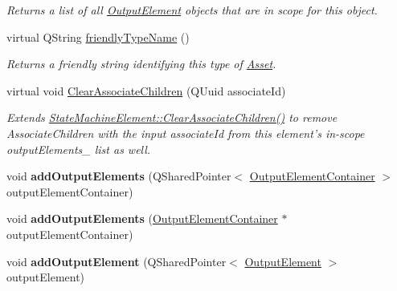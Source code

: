 \begin{DoxyCompactItemize}
\begin{DoxyCompactList}\small\item\em Returns a list of all \hyperlink{class_picto_1_1_output_element}{Output\-Element} objects that are in scope for this object. \end{DoxyCompactList}\item 
virtual Q\-String \hyperlink{class_picto_1_1_output_element_container_aeb790e110381366623cda30e484eba89}{friendly\-Type\-Name} ()
\begin{DoxyCompactList}\small\item\em Returns a friendly string identifying this type of \hyperlink{class_picto_1_1_asset}{Asset}. \end{DoxyCompactList}\item 
\hypertarget{class_picto_1_1_output_element_container_a557009c1557ac06b07cd77bf8efc57c8}{virtual void \hyperlink{class_picto_1_1_output_element_container_a557009c1557ac06b07cd77bf8efc57c8}{Clear\-Associate\-Children} (Q\-Uuid associate\-Id)}\label{class_picto_1_1_output_element_container_a557009c1557ac06b07cd77bf8efc57c8}

\begin{DoxyCompactList}\small\item\em Extends \hyperlink{class_picto_1_1_scriptable_container_aae5dda0b9e1a2e2d8f9e182d28099020}{State\-Machine\-Element\-::\-Clear\-Associate\-Children()} to remove Associate\-Children with the input associate\-Id from this element's in-\/scope output\-Elements\-\_\- list as well. \end{DoxyCompactList}\item 
\hypertarget{class_picto_1_1_output_element_container_ac1895811ea69565d51c1bdd87e05aaa1}{void {\bfseries add\-Output\-Elements} (Q\-Shared\-Pointer$<$ \hyperlink{class_picto_1_1_output_element_container}{Output\-Element\-Container} $>$ output\-Element\-Container)}\label{class_picto_1_1_output_element_container_ac1895811ea69565d51c1bdd87e05aaa1}

\item 
\hypertarget{class_picto_1_1_output_element_container_a87d298b27888a83b6efb3d2df3f5023e}{void {\bfseries add\-Output\-Elements} (\hyperlink{class_picto_1_1_output_element_container}{Output\-Element\-Container} $\ast$output\-Element\-Container)}\label{class_picto_1_1_output_element_container_a87d298b27888a83b6efb3d2df3f5023e}

\item 
\hypertarget{class_picto_1_1_output_element_container_ad8d546b050c1884da1b5c5766717d9e2}{void {\bfseries add\-Output\-Element} (Q\-Shared\-Pointer$<$ \hyperlink{class_picto_1_1_output_element}{Output\-Element} $>$ output\-Element)}\label{class_picto_1_1_output_element_container_ad8d546b050c1884da1b5c5766717d9e2}


\end{DoxyCompactItemize}
